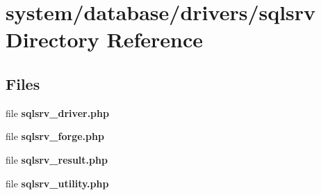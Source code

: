 \section{system/database/drivers/sqlsrv Directory Reference}
\label{dir_e0316cb2d3241c0b7da8a07bd66febae}
\subsection*{Files}
\begin{DoxyCompactItemize}
\item 
file {\bf sqlsrv\-\_\-driver.\-php}
\item 
file {\bf sqlsrv\-\_\-forge.\-php}
\item 
file {\bf sqlsrv\-\_\-result.\-php}
\item 
file {\bf sqlsrv\-\_\-utility.\-php}
\end{DoxyCompactItemize}
